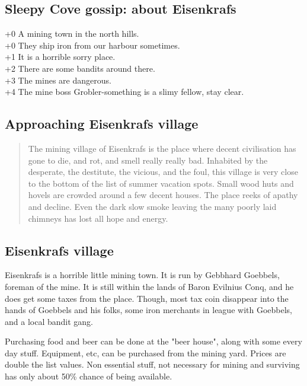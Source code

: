 \documentclass[11pt, twoside, titlepage, a4paper]{report}
\newenvironment{readoutloud}%
{\begin{quote}\begin{itshape}}%
{\end{itshape}\end{quote}}%
\begin{document}
\subsection*{Sleepy Cove gossip: about Eisenkrafs}
+0 A mining town in the north hills. \\
+0 They ship iron from our harbour sometimes. \\
+1 It is a horrible sorry place. \\
+2 There are some bandits around there. \\
+3 The mines are dangerous. \\
+4 The mine boss Grobler-something is a slimy fellow, stay clear. \\


\subsection*{Approaching Eisenkrafs village}
\begin{readoutloud}
The mining village of Eisenkrafs is the place where decent civilisation has gone to die, and rot, and smell really really bad. Inhabited by the desperate, the destitute, the vicious, and the foul, this village is very close to the bottom of the list of summer vacation spots. Small wood huts and hovels are crowded around a few decent houses. The place reeks of apathy and decline. Even the dark slow smoke leaving the many poorly laid chimneys has lost all hope and energy.
\end{readoutloud}


\subsection*{Eisenkrafs village}
Eisenkrafs is a horrible little mining town. It is run by Gebbhard Goebbels, foreman of the mine. It is still within the lands of Baron Evilnius Conq, and he does get some taxes from the place. Though, most tax coin disappear into the hands of Goebbels and his folks, some iron merchants in league with Goebbels, and a local bandit gang.

Purchasing food and beer can be done at the "beer house", along with some every day stuff. Equipment, etc, can be purchased from the mining yard. Prices are double the list values. Non essential stuff, not necessary for mining and surviving has only about 50\% chance of being available.
\end{document}
